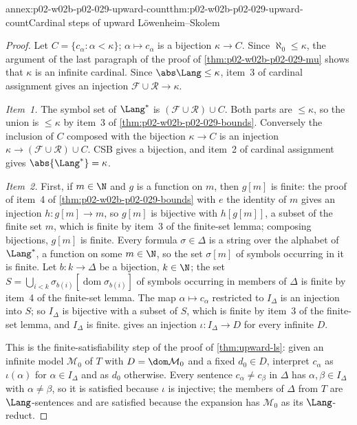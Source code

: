 \begin{annexitem}{annex:p02-w02b-p02-029-upward-count}{thm:p02-w02b-p02-029-upward-count}{Cardinal steps of upward L\"owenheim--Skolem}
\begin{proof}
Let \(C=\{c_\alpha:\alpha<\kappa\}\); \(\alpha\mapsto c_\alpha\) is a
bijection \(\kappa\to C\). Since \(\aleph_0\leq\kappa\), the argument of the
last paragraph of the proof of \cref{thm:p02-w02b-p02-029-mu} shows that
\(\kappa\) is an infinite cardinal. Since \(\abs\Lang\leq\kappa\), item~3
of cardinal assignment gives an injection
\(\mathcal F\cup\mathcal R\to\kappa\).

\emph{Item~1.} The symbol set of \(\Lang^*\) is
\((\mathcal F\cup\mathcal R)\cup C\). Both parts are \(\leq\kappa\), so the
union is \(\leq\kappa\) by item~3 of \cref{thm:p02-w02b-p02-029-bounds}.
Conversely the inclusion of \(C\) composed with the bijection
\(\kappa\to C\) is an injection \(\kappa\to(\mathcal F\cup\mathcal R)\cup C\).
CSB gives a bijection, and item~2 of cardinal assignment gives
\(\abs{\Lang^*}=\kappa\).

\emph{Item~2.} First, if \(m\in\N\) and \(g\) is a function on \(m\), then
\(g[m]\) is finite: the proof of item~4 of
\cref{thm:p02-w02b-p02-029-bounds} with \(e\) the identity of \(m\) gives an
injection \(h:g[m]\to m\), so \(g[m]\) is bijective with \(h[g[m]]\), a
subset of the finite set \(m\), which is finite by item~3 of the finite-set
lemma; composing bijections, \(g[m]\) is finite. Every formula
\(\sigma\in\Delta\) is a string over the alphabet of \(\Lang^*\), a function
on some \(m\in\N\), so the set \(\sigma[m]\) of symbols occurring in it is
finite. Let \(b:k\to\Delta\) be a bijection, \(k\in\N\); the set
\(S=\bigcup_{i<k}\sigma_{b(i)}[\operatorname{dom}\sigma_{b(i)}]\) of
symbols occurring in members of \(\Delta\) is finite by item~4 of the
finite-set lemma. The map \(\alpha\mapsto c_\alpha\) restricted to
\(I_\Delta\) is an injection into \(S\); so \(I_\Delta\) is bijective with a
subset of \(S\), which is finite by item~3 of the finite-set lemma, and
\(I_\Delta\) is finite.  gives an
injection \(\iota:I_\Delta\to D\) for every infinite \(D\).

This is the finite-satisfiability step of the proof of \cref{thm:upward-ls}:
given an infinite model \(\mathcal M_0\) of \(T\) with \(D=\dom\mathcal M_0\)
and a fixed \(d_0\in D\), interpret \(c_\alpha\) as \(\iota(\alpha)\) for
\(\alpha\in I_\Delta\) and as \(d_0\) otherwise. Every sentence
\(c_\alpha\ne c_\beta\) in \(\Delta\) has \(\alpha,\beta\in I_\Delta\) with
\(\alpha\neq\beta\), so it is satisfied because \(\iota\) is injective; the
members of \(\Delta\) from \(T\) are \(\Lang\)-sentences and are satisfied
because the expansion has \(\mathcal M_0\) as its \(\Lang\)-reduct.


\end{proof}
\end{annexitem}
